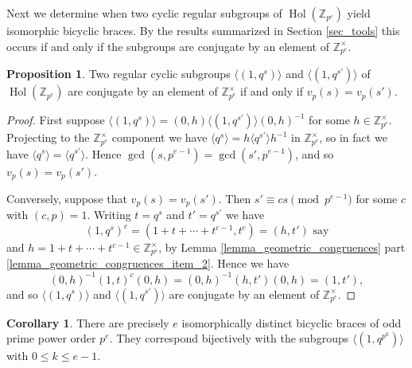 \documentclass[reqno]{amsart}
\theoremstyle{definition}
\newtheorem{proposition}[theorem]{Proposition}
\newtheorem{corollary}[theorem]{Corollary}
\newcommand{\Z}{\mathbb{Z}}
\DeclareMathOperator{\Hol}{\mbox{Hol}}
\begin{document}
Next we determine when two cyclic regular subgroups of $ \Hol(\Z_{p^{e}}) $ yield isomorphic bicyclic braces. By the results summarized in Section \ref{sec_tools} this occurs if and only if the subgroups are conjugate by an element of $ \Z_{p^{e}}^{\times} $.

\begin{proposition}\label{prop_iso_odd}
Two regular cyclic subgroups $ \langle (1,q^{s}) \rangle $ and $ \langle (1,q^{s'}) \rangle $ of $ \Hol(\Z_{p^{e}}) $ are conjugate by an element of $ \Z_{p^{e}}^{\times} $ if and only if $ v_{p}(s) = v_{p}(s') $. 
\end{proposition}
\begin{proof}
First suppose $ \langle (1,q^{s}) \rangle = (0,h) \langle (1,q^{s'}) \rangle (0,h)^{-1} $ for some $ h \in \Z_{p^{e}}^{\times} $. Projecting to the $ \Z_{p^{e}}^{\times}  $ component we have $ \langle q^{s} \rangle = h \langle q^{s'} \rangle h^{-1} $ in $ \Z_{p^{e}}^{\times} $, so in fact we have $ \langle q^{s} \rangle = \langle q^{s'} \rangle $. Hence $ \gcd(s,p^{e-1})=\gcd(s',p^{e-1}) $, and so $ v_{p}(s)=v_{p}(s') $. 

Conversely, suppose that $ v_{p}(s) = v_{p}(s') $. Then $ s' \equiv c s \pmod{p^{e-1}} $ for some $ c $ with $ (c,p)=1 $. Writing $ t = q^{s} $ and $ t'=q^{s'} $ we have 
\[ (1,q^{s})^{c} = (1+t+ \cdots + t^{c-1},t^{c}) = (h,t') \mbox{ say}  \]
and $ h=1+t+ \cdots +t^{c-1} \in \Z_{p^{e}}^{\times} $, by Lemma \ref{lemma_geometric_congruences} part \ref{lemma_geometric_congruences_item_2}. Hence we have
\[ (0,h)^{-1} (1,t)^{c} (0,h) = (0,h)^{-1}(h, t')(0,h) = (1,t'), \]
and so $\langle(1,q^{s})\rangle$ and $\langle(1,q^{s'})\rangle$ are conjugate by an element of $ \Z_{p^{e}}^{\times} $.
\end{proof}

\begin{corollary}
There are precisely $ e $ isomorphically distinct bicyclic braces of odd prime power order $ p^{e} $. They correspond bijectively with the subgroups $ \langle (1,q^{p^{k}}) \rangle $ with $ 0 \leq k \leq e-1 $. 
\end{corollary}

\end{document}
